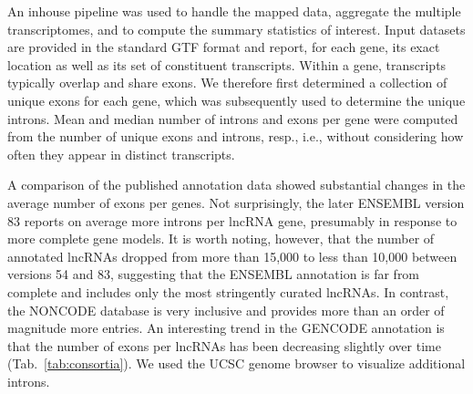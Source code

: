 \documentclass[ncrna,article,submit,moreauthors,pdftex,10pt,a4paper]{mdpi}
\begin{document}
An inhouse pipeline was used to handle the mapped data, aggregate the
multiple transcriptomes, and to compute the summary statistics of
interest. Input datasets are provided in the standard GTF format and
report, for each gene, its exact location as well as its set of constituent
transcripts. Within a gene, transcripts typically overlap and share exons.
We therefore first determined a collection of unique exons for each gene,
which was subsequently used to determine the unique introns. Mean and
median number of introns and exons per gene were computed from the number
of unique exons and introns, resp., i.e., without considering how often
they appear in distinct transcripts.

A comparison of the published annotation data showed substantial changes in
the average number of exons per genes. Not surprisingly, the later ENSEMBL
version 83 reports on average more introns per lncRNA gene, presumably in
response to more complete gene models. It is worth noting, however, that
the number of annotated lncRNAs dropped from more than 15,000 to less than
10,000 between versions 54 and 83, suggesting that the ENSEMBL annotation
is far from complete and includes only the most stringently curated
lncRNAs. In contrast, the NONCODE database is very inclusive and provides
more than an order of magnitude more entries. An interesting trend in the
GENCODE annotation is that the number of exons per lncRNAs has been
decreasing slightly over time (Tab.~\ref{tab:consortia}).  We used the UCSC
genome browser \cite{Kent:02} to visualize additional introns.

\vspace{6pt} 








\end{document}

